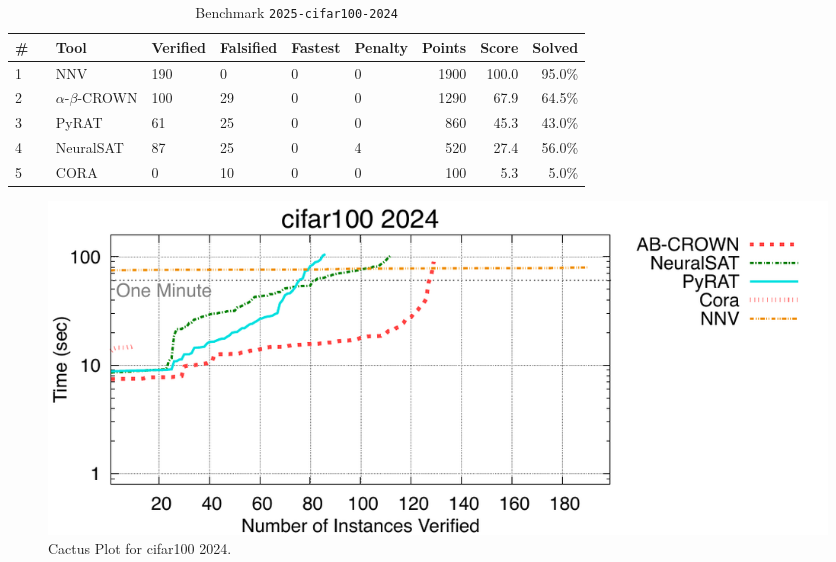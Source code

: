 \begin{table}[h]
\begin{center}
\caption{Benchmark \texttt{2025-cifar100-2024}} \label{tab:cat_2025_cifar100_2024}
{\setlength{\tabcolsep}{2pt}
\begin{tabular}[h]{@{}llllllrrr@{}}
\toprule
\textbf{\# ~} & \textbf{Tool} & \textbf{Verified} & \textbf{Falsified} & \textbf{Fastest} & \textbf{Penalty} & \textbf{Points} & \textbf{Score} & \textbf{Solved}\\
\midrule
1 & NNV & 190 & 0 & 0 & 0 & 1900 & 100.0 & 95.0\% \\
2 & $\alpha$-$\beta$-CROWN & 100 & 29 & 0 & 0 & 1290 & 67.9 & 64.5\% \\
3 & PyRAT & 61 & 25 & 0 & 0 & 860 & 45.3 & 43.0\% \\
4 & NeuralSAT & 87 & 25 & 0 & 4 & 520 & 27.4 & 56.0\% \\
5 & CORA & 0 & 10 & 0 & 0 & 100 & 5.3 & 5.0\% \\
\bottomrule
\end{tabular}
}
\end{center}
\end{table}



\begin{figure}[h]
\centerline{\includegraphics[width=\textwidth]{cactus/2025_cifar100_2024.pdf}}
\caption{Cactus Plot for cifar100 2024.}
\label{fig:quantPic}
\end{figure}


\clearpage

